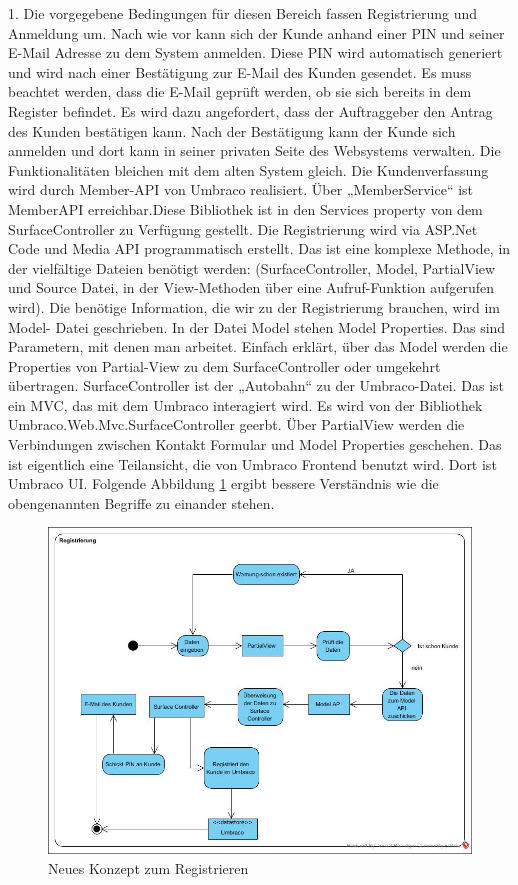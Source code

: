 1. Die vorgegebene Bedingungen für diesen Bereich fassen Registrierung und Anmeldung um. Nach wie vor kann sich der Kunde anhand einer \ac{PIN} und seiner E-Mail Adresse zu dem System anmelden. Diese PIN wird automatisch generiert und  wird nach einer Bestätigung zur E-Mail des Kunden gesendet. Es muss beachtet werden, dass die E-Mail geprüft werden, ob sie sich bereits in dem Register befindet. Es wird dazu angefordert, dass der Auftraggeber den Antrag des Kunden bestätigen kann. Nach der Bestätigung kann der Kunde sich anmelden und dort kann in seiner privaten Seite des Websystems verwalten. Die Funktionalitäten bleichen mit dem alten System gleich.
Die Kundenverfassung wird durch Member-\ac{API} von Umbraco realisiert. 
Über „MemberService“ ist MemberAPI erreichbar.Diese Bibliothek ist in den Services\cite{UmbracoHQ2018Services} property von dem SurfaceController \cite{UmbracoHQ2018SurfaceController} zu Verfügung gestellt. 
Die Registrierung wird via ASP.Net Code und Media API programmatisch erstellt. Das ist eine komplexe Methode, in der vielfältige Dateien benötigt werden: (SurfaceController, Model\cite{UmbracoHQ2018Models}, PartialView und Source Datei, in der View-Methoden über eine Aufruf-Funktion aufgerufen wird). Die benötige Information, die wir zu der Registrierung brauchen, wird im Model- Datei geschrieben. 
In der Datei Model stehen Model Properties. Das sind Parametern, mit denen man arbeitet. Einfach erklärt, über das Model werden die Properties von Partial-View zu dem SurfaceController oder umgekehrt übertragen.
SurfaceController ist der „Autobahn“ zu der Umbraco-Datei. Das ist ein \ac{MVC}, das mit dem Umbraco interagiert wird. Es wird von der Bibliothek Umbraco.Web.Mvc.SurfaceController geerbt. 
Über PartialView werden die Verbindungen zwischen Kontakt Formular und Model Properties geschehen. Das ist eigentlich eine Teilansicht, die von Umbraco Frontend benutzt wird. Dort ist Umbraco \ac{UI}. 
Folgende Abbildung \ref{fig:Registrierung} ergibt bessere Verständnis wie die obengenannten Begriffe zu einander stehen.

\begin{figure}[h]
	\centering
	\includegraphics[width=1\linewidth]{Graphics/Registrierung.JPG}
	\caption[neues Konzept: Registrierung]{Neues Konzept zum Registrieren}
	\label{fig:Registrierung}
\end{figure}

